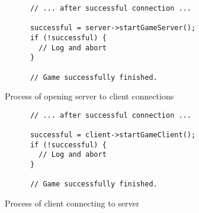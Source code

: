 \begin{figure}[!h]
  \centering
  \begin{lstlisting}
      // ... after successful connection ...

      successful = server->startGameServer();
      if (!successful) {
        // Log and abort
      }

      // Game successfully finished.
  \end{lstlisting}
  \caption{Process of opening server to client connections}
  \label{code:server_game}
\end{figure}

\begin{figure}[!h]
  \centering
  \begin{lstlisting}
      // ... after successful connection ...

      successful = client->startGameClient();
      if (!successful) {
        // Log and abort
      }

      // Game successfully finished.
  \end{lstlisting}
  \caption{Process of client connecting to server}
  \label{code:client_game}
\end{figure}
